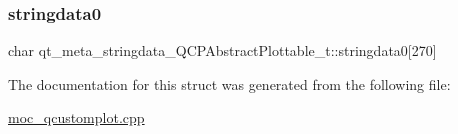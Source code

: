 \subsubsection{\texorpdfstring{stringdata0}{stringdata0}}
{\footnotesize\ttfamily char qt\+\_\+meta\+\_\+stringdata\+\_\+\+Q\+C\+P\+Abstract\+Plottable\+\_\+t\+::stringdata0\mbox{[}270\mbox{]}}



The documentation for this struct was generated from the following file\+:\begin{DoxyCompactItemize}
\item 
\mbox{\hyperlink{moc__qcustomplot_8cpp}{moc\+\_\+qcustomplot.\+cpp}}\end{DoxyCompactItemize}
